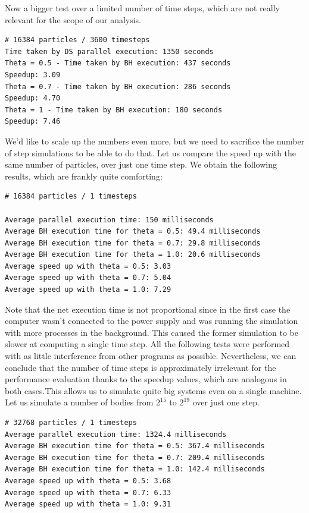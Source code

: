 \documentclass{article}
\begin{document}
Now a bigger test over a limited number of time steps, which are not really relevant for the scope of our analysis.
\begin{boxA}
\begin{verbatim}
# 16384 particles / 3600 timesteps 
Time taken by DS parallel execution: 1350 seconds
Theta = 0.5 - Time taken by BH execution: 437 seconds
Speedup: 3.09
Theta = 0.7 - Time taken by BH execution: 286 seconds
Speedup: 4.70
Theta = 1 - Time taken by BH execution: 180 seconds
Speedup: 7.46
\end{verbatim}
\end{boxA}

We'd like to scale up the numbers even more, but we need to sacrifice the number of step simulations to be able to do that. Let us compare the speed up with the same number of particles, over just one time step. We obtain the following results, which are frankly quite comforting: \\
\begin{boxA}
\begin{verbatim}
# 16384 particles / 1 timesteps

Average parallel execution time: 150 milliseconds
Average BH execution time for theta = 0.5: 49.4 milliseconds
Average BH execution time for theta = 0.7: 29.8 milliseconds
Average BH execution time for theta = 1.0: 20.6 milliseconds
Average speed up with theta = 0.5: 3.03
Average speed up with theta = 0.7: 5.04
Average speed up with theta = 1.0: 7.29
\end{verbatim}
\end{boxA}
\noindent Note that the net execution time is not proportional since in the first case the computer wasn't connected to the power supply and was running the simulation with more processes in the background. This caused the former simulation to be slower at computing a single time step. All the following tests were performed with as little interference from other programs as possible. Nevertheless, we can conclude that the number of time steps is approximately irrelevant for the performance evaluation thanks to the speedup values, which are analogous in both cases.This allows us to simulate quite big systems even on a single machine. Let us simulate a number of bodies from $2^{15}$ to $2^{19}$ over just one step. 

\begin{boxA}
    \begin{verbatim}
# 32768 particles / 1 timesteps
Average parallel execution time: 1324.4 milliseconds
Average BH execution time for theta = 0.5: 367.4 milliseconds
Average BH execution time for theta = 0.7: 209.4 milliseconds
Average BH execution time for theta = 1.0: 142.4 milliseconds
Average speed up with theta = 0.5: 3.68
Average speed up with theta = 0.7: 6.33
Average speed up with theta = 1.0: 9.31
\end{verbatim}
\end{boxA}
\end{document}
